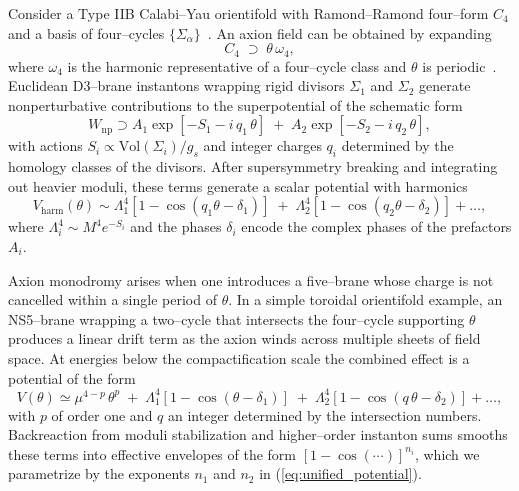 \documentclass[a4paper,11pt]{article}
\begin{document}
Consider a Type IIB Calabi–Yau orientifold with Ramond–Ramond four–form $C_4$ and a basis of four–cycles $\{\Sigma_{\alpha}\}$~\cite{GKP, KKLT}. An axion field can be obtained by expanding
\begin{equation}
    C_4 \;\supset\; \theta\,\omega_4,
\end{equation}
where $\omega_4$ is the harmonic representative of a four–cycle class and $\theta$ is periodic~\cite{Svrcek_Witten}. Euclidean D3–brane instantons wrapping rigid divisors $\Sigma_1$ and $\Sigma_2$ generate nonperturbative contributions to the superpotential of the schematic form
\begin{equation}
    W_{\text{np}} \supset A_1 \exp\!\left[-S_1 - i\,q_1\,\theta\right] \;+\; A_2 \exp\!\left[-S_2 - i\,q_2\,\theta\right],
\end{equation}
with actions $S_i \propto \text{Vol}(\Sigma_i) / g_s$ and integer charges $q_i$ determined by the homology classes of the divisors. After supersymmetry breaking and integrating out heavier moduli, these terms generate a scalar potential with harmonics
\begin{equation}
    V_{\text{harm}}(\theta) \sim \Lambda_1^4 \left[1 - \cos(q_1 \theta - \delta_1)\right] \;+\; \Lambda_2^4 \left[1 - \cos(q_2 \theta - \delta_2)\right] + \ldots,
\end{equation}
where $\Lambda_i^4 \sim M^4 e^{-S_i}$ and the phases $\delta_i$ encode the complex phases of the prefactors $A_i$.

Axion monodromy arises when one introduces a five–brane whose charge is not cancelled within a single period of $\theta$. In a simple toroidal orientifold example, an NS5–brane wrapping a two–cycle that intersects the four–cycle supporting $\theta$ produces a linear drift term as the axion winds across multiple sheets of field space. At energies below the compactification scale the combined effect is a potential of the form
\begin{equation}
    V(\theta) \simeq \mu^{4-p}\,\theta^{p} \;+\; \Lambda_1^4 \left[1 - \cos(\theta - \delta_1)\right] \;+\; \Lambda_2^4 \left[1 - \cos(q\,\theta - \delta_2)\right] + \ldots,
\end{equation}
with $p$ of order one and $q$ an integer determined by the intersection numbers. Backreaction from moduli stabilization and higher–order instanton sums smooths these terms into effective envelopes of the form $[1 - \cos(\cdots)]^{n_i}$, which we parametrize by the exponents $n_1$ and $n_2$ in (\ref{eq:unified_potential}).
\end{document}
